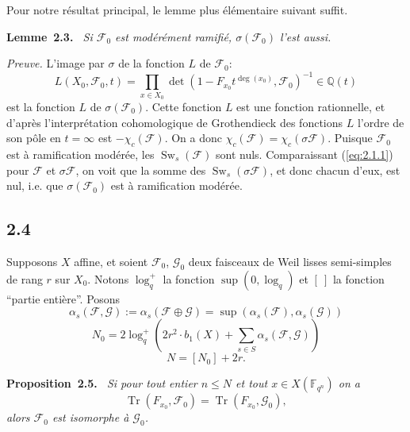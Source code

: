 \documentclass[11pt,a4paper]{article}
\makeatletter
\theoremstyle{plain}
\theoremstyle{definition}
\newenvironment{manualblock}[4]{%
  \par\medskip\noindent\textbf{#1~#2#3.}\def\@currentlabel{#2}\label{#4}\itshape\ }{\par\normalfont\medskip}
\DeclareMathOperator{\Sw}{Sw}
\DeclareMathOperator{\tr}{Tr}
\makeatother
\begin{document}
Pour notre r\'esultat principal, le lemme plus \'el\'ementaire suivant suffit.

\begin{manualblock}{Lemme}{2.3}{}{lem:2.3}
Si $\mathcal{F}_0$ est mod\'er\'ement ramifi\'e, $\sigma(\mathcal{F}_0)$ l'est aussi.
\end{manualblock}

\noindent\textit{Preuve.} L'image par $\sigma$ de la fonction $L$ de $\mathcal{F}_0$:
\[
L(X_0, \mathcal{F}_0, t) = \prod_{x \in X_0} \det(1 - F_{x_0} t^{\deg(x_0)}, \mathcal{F}_0)^{-1} \in \mathbb{Q}(t)
\]
est la fonction $L$ de $\sigma(\mathcal{F}_0)$. Cette fonction $L$ est une fonction rationnelle, et d'apr\`es l'interpr\'etation cohomologique de Grothendieck des fonctions $L$ l'ordre de son p\^ole en $t = \infty$ est $-\chi_c(\mathcal{F})$. On a donc $\chi_c(\mathcal{F}) = \chi_c(\sigma \mathcal{F})$. Puisque $\mathcal{F}_0$ est \`a ramification mod\'er\'ee, les $\Sw_s(\mathcal{F})$ sont nuls. Comparaissant (\ref{eq:2.1.1}) pour $\mathcal{F}$ et $\sigma \mathcal{F}$, on voit que la somme des $\Sw_s(\sigma \mathcal{F})$, et donc chacun d'eux, est nul, i.e. que $\sigma(\mathcal{F}_0)$ est \`a ramification mod\'er\'ee.

\subsection*{2.4}

Supposons $X$ affine, et soient $\mathcal{F}_0$, $\mathcal{G}_0$ deux faisceaux de Weil lisses semi-simples de rang $r$ sur $X_0$. Notons $\log_q^+$ la fonction $\sup(0, \log_q)$ et $[\ ]$ la fonction ``partie enti\`ere''. Posons
\begin{equation}\label{eq:2.4.1}
\alpha_s(\mathcal{F}, \mathcal{G}) := \alpha_s(\mathcal{F} \oplus \mathcal{G}) = \sup(\alpha_s(\mathcal{F}), \alpha_s(\mathcal{G}))
\end{equation}
\begin{equation}\label{eq:2.4.2}
N_0 = 2\log_q^+\left(2r^2 \cdot b_1(X) + \sum_{s \in S} \alpha_s(\mathcal{F}, \mathcal{G})\right)
\end{equation}
\begin{equation}\label{eq:2.4.3}
N = [N_0] + 2r.
\end{equation}

\begin{manualblock}{Proposition}{2.5}{}{prop:2.5}
Si pour tout entier $n \leq N$ et tout $x \in X(\mathbb{F}_{q^n})$ on a
\[
\tr(F_{x_0}, \mathcal{F}_0) = \tr(F_{x_0}, \mathcal{G}_0),
\]
alors $\mathcal{F}_0$ est isomorphe \`a $\mathcal{G}_0$.
\end{manualblock}
\end{document}
